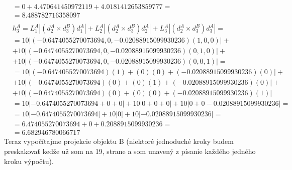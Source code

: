\documentclass[a4paper]{article}
\begin{document}
\begin{align*}
		&=0 +
		4.470641450972119+
		4.0181412653859777 =
		\\
		&= 8.488782716358097
		\\
		\\
		&h_3^A = L_1^A|(d_2^A \times d_3^B) d_1^A | + L_2^A|(d_2^A \times d_3^B) d_2^A | + L_3^A|(d_2^A \times d_3^B) d_3^A | = 
		\\
		&= 10| (-0.6474055270073694, 0, -0.02088915099930236) (1,0,0) |+
		\\
		&+ 10| (-0.6474055270073694, 0, -0.02088915099930236) (0,1,0) |+
		\\
		&+ 10| (-0.6474055270073694, 0, -0.02088915099930236) (0,0,1) |=
		\\
		&=10 | (-0.6474055270073694)(1) + (0)(0) + (-0.02088915099930236)(0)  |+
		\\
		& +10 | (-0.6474055270073694)(0) + (0)(1) + (-0.02088915099930236)(0)  | +
		\\
		& +10 | (-0.6474055270073694)(0) + (0)(0) + (-0.02088915099930236)(1)  | 
		\\
		&= 10| -0.6474055270073694 + 0 + 0 | +
		10| 0 + 0 + 0 |+
		10| 0 + 0 -0.02088915099930236 |=
		\\
		&= 10| -0.6474055270073694 | +
		10| 0 |+
		10| -0.02088915099930236 |=
		\\
		&=6.474055270073694 +
		0+
		0.2088915099930236 =
		\\
		&= 6.682946780066717
	\end{align*}
	\newpage
	Teraz vypočítajme projekcie objektu B (niektoré jednoduché kroky budem preskakovať keďže už som na 19, strane a som unavený z písanie každého jedného kroku výpočtu).
\end{document}
